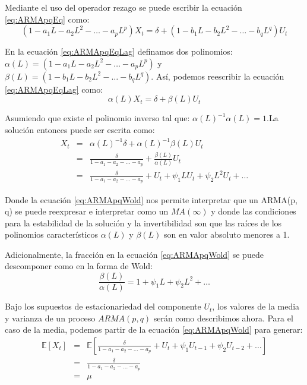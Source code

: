 \documentclass[
]{book}
\begin{document}
Mediante el uso del operador rezago se puede escribir la ecuación \eqref{eq:ARMApqEq} como:
\begin{equation}
    (1 - a_1 L - a_2 L^2 - \ldots - a_p L^p) X_t = \delta + (1 - b_1 L - b_2 L^2 - \ldots - b_q L^q) U_t 
    \label{eq:ARMApqEqLag}
\end{equation}

En la ecuación \eqref{eq:ARMApqEqLag} definamos dos polinomios: \(\alpha(L) = (1 - a_1 L - a_2 L^2 - \ldots - a_p L^p)\) y \(\beta(L) = (1 - b_1 L - b_2 L^2 - \ldots - b_q L^q)\). Así, podemos reescribir la ecuación \eqref{eq:ARMApqEqLag} como:
\begin{equation}
    \alpha(L) X_t = \delta + \beta(L) U_t 
\end{equation}

Asumiendo que existe el polinomio inverso tal que: \(\alpha(L)^{-1}\alpha(L) = 1\).La solución entonces puede ser escrita como:
\begin{eqnarray}
    X_t & = & \alpha(L)^{-1} \delta + \alpha(L)^{-1} \beta(L) U_t \nonumber \\
    & = & \frac{\delta}{1 - a_1 - a_2 - \ldots - a_p} + \frac{\beta(L)}{\alpha(L)} U_t \nonumber \\
    & = & \frac{\delta}{1 - a_1 - a_2 - \ldots - a_p} + U_t + \psi_1 L U_t + \psi_2 L^2 U_t + \ldots
    \label{eq:ARMApqWold}
\end{eqnarray}

Donde la ecuación \eqref{eq:ARMApqWold} nos permite interpretar que un ARMA(p, q) se puede reexpresar e interpretar como un \(MA(\infty)\) y donde las condiciones para la estabilidad de la solución y la invertibilidad son que las raíces de los polinomios característicos \(\alpha(L)\) y \(\beta(L)\) son en valor absoluto menores a 1.

Adicionalmente, la fracción en la ecuación \eqref{eq:ARMApqWold} se puede descomponer como en la forma de Wold:
\begin{equation}
    \frac{\beta(L)}{\alpha(L)} = 1 + \psi_1 L + \psi_2 L^2 + \ldots
\end{equation}

Bajo los supuestos de estacionariedad del componente \(U_t\), los valores de la media y varianza de un proceso \(ARMA(p, q)\) serán como describimos ahora. Para el caso de la media, podemos partir de la ecuación \eqref{eq:ARMApqWold} para generar:
\begin{eqnarray}
    \mathbb{E}[X_t] & = & \mathbb{E}\left[ \frac{\delta}{1 - a_1 - a_2 - \ldots - a_p} + U_t + \psi_1 U_{t-1} + \psi_2 U_{t-2} + \ldots \right] \nonumber \\
    & = & \frac{\delta}{1 - a_1 - a_2 - \ldots - a_p} \nonumber \\
    & = & \mu
\end{eqnarray}
\end{document}
